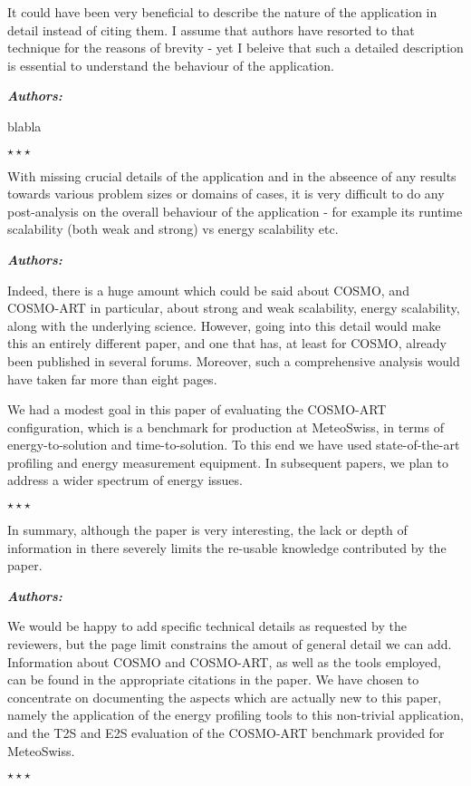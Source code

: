 \documentclass[a4paper,11pt]{article}
\newcounter{question}
\newcommand{\weReply}{\vspace{0.25cm} {\bf \noindent } \addtocounter{question}{1} \textbf{\emph{Authors:}} \medskip \em\par}
\newenvironment{weSay}{\bigskip \weReply \begin{it}}{\end{it}\begin{center} \samepage$\star \star \star$ \end{center}}
\begin{document}
It could have been very beneficial to describe the nature of the application in detail instead of 
citing them. I assume that authors have resorted to that technique for the reasons of brevity  - yet 
I beleive that such a detailed description is essential to understand the behaviour of the application.

\begin{weSay}
blabla
\end{weSay}

With missing crucial details of the application and in the abseence of any results towards various 
problem sizes or domains of cases, it is very difficult to do any post-analysis on the overall 
behaviour of the application - for example its runtime scalability (both weak and strong) vs energy 
scalability etc.

\begin{weSay}
Indeed, there is a huge amount which could be said about COSMO, and COSMO-ART in particular, about strong and weak scalability, energy scalability, along with the underlying science.  However, going into this detail would make this an entirely different paper, and one that has, at least for COSMO, already been published in several forums.   Moreover, such a comprehensive analysis would have taken far more than eight pages.

We had a modest goal in this paper of evaluating the COSMO-ART configuration, which is a benchmark for production at MeteoSwiss, in terms of energy-to-solution and time-to-solution.  To this end we have used state-of-the-art profiling and energy measurement equipment.   In subsequent papers, we plan to address a wider spectrum of energy issues.    
\end{weSay}

In summary, although the paper is very interesting, the lack or depth of information in there severely 
limits the re-usable knowledge contributed by the paper.

\begin{weSay}
We would be happy to add specific technical details as requested by the reviewers, but the page limit constrains the amout of general detail we can add.  Information about COSMO and COSMO-ART, as well as the tools employed, can be found in the appropriate citations in the paper.  We have chosen to concentrate on documenting the aspects which are actually new to this paper, namely the application of the energy profiling tools to this non-trivial application, and the T2S and E2S evaluation of the COSMO-ART benchmark provided for MeteoSwiss.  
\end{weSay}
\end{document}
